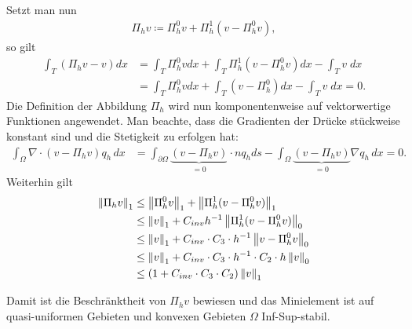 \begin{beweis}
\begin{enumerate}
\vspace{5mm}
Setzt man nun
\begin{align*}
  \Pi_{h} v \coloneqq \Pi_{h}^{0}v + \Pi_{h}^{1}(v - \Pi_{h}^{0} v),
\end{align*}
so gilt
\begin{align*}
  \int_{T}(\Pi_{h}v - v) dx &=   \int_{T}\Pi^{0}_{h}v  dx +  \int_{T}\Pi^{1}_{h}(v - \Pi_{h}^{0} v )dx - \int_{T} v \; dx\\
&=   \int_{T}\Pi^{0}_{h}v  dx +  \int_{T}(v - \Pi^{0}_{h})dx - \int_{T} v \; dx = 0. 
\end{align*}
Die Definition der Abbildung $\Pi_{h}$ wird nun komponentenweise auf vektorwertige Funktionen angewendet. Man beachte, dass die Gradienten der Drücke stückweise konstant sind und die Stetigkeit zu erfolgen hat:
\begin{align*}
  \int_{\Omega} \nabla\cdot(v - \Pi_{h}v) q_{h} \, dx &= \int_{\partial \Omega} \underbrace{(v - \Pi_{h}v)}_{= 0}\cdot n q_{h} ds - \int_{\Omega}\underbrace{(v - \Pi_{h} v)}_{= 0}\nabla q_{h}\, dx = 0. 
\end{align*}
Weiterhin gilt
\begin{align*}
  \left \|\Pi_{h}v \right\|_{1} &\leq   \left \|\Pi^{0}_{h}v \right\|_{1} +   \left \|\Pi_{h}^{1}(v- \Pi_{h}^{0}v) \right\| _{1}\\
&\leq   \left \|v \right\|_{1} +   C_{inv} h^{-1} \left \|\Pi_{h}^{1}(v- \Pi_{h}^{0}v) \right\| _{0}\\
&\leq   \left \|v \right\|_{1} +   C_{inv} \cdot C_{3} \cdot h^{-1} \left \|v- \Pi_{h}^{0}v \right\| _{0}\\
&\leq   \left \|v \right\|_{1} +   C_{inv} \cdot C_{3} \cdot h^{-1}\cdot C_{2}\cdot h \left \|v \right\| _{0}\\
&\leq  (1+  C_{inv} \cdot C_{3} \cdot C_{2}) \left \|v \right\| _{1}
\end{align*}
\end{enumerate}
Damit ist die Beschränktheit von $\Pi_{h}v$ bewiesen und das Minielement ist auf quasi-uniformen Gebieten und konvexen Gebieten $\Omega$ Inf-Sup-stabil. 
\end{beweis}

